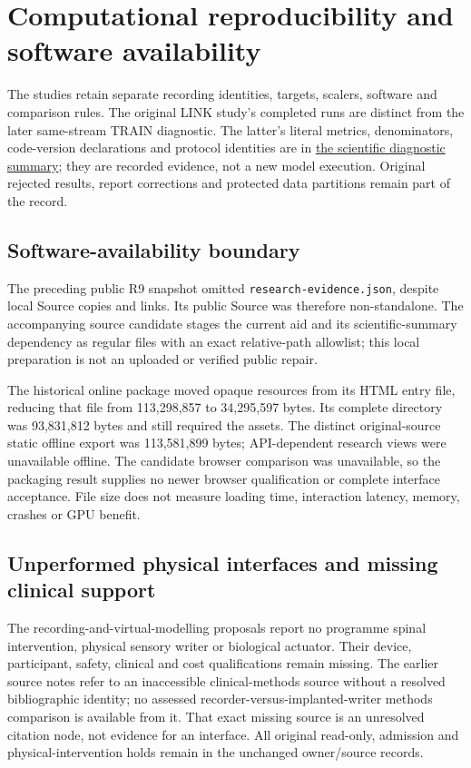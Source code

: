 \section{Computational reproducibility and software availability}
\label{app:reproducibility-availability}

The studies retain separate recording identities, targets, scalers, software and comparison rules. The original LINK study's completed runs are distinct from the later same-stream TRAIN diagnostic. The latter's literal metrics, denominators, code-version declarations and protocol identities are in \href{training-diagnostic-summary.json}{the scientific diagnostic summary}; they are recorded evidence, not a new model execution. Original rejected results, report corrections and protected data partitions remain part of the record.

\subsection{Software-availability boundary}
The preceding public R9 snapshot omitted \texttt{research-evidence.json}, despite local Source copies and links. Its public Source was therefore non-standalone. The accompanying source candidate stages the current aid and its scientific-summary dependency as regular files with an exact relative-path allowlist; this local preparation is not an uploaded or verified public repair.

The historical online package moved opaque resources from its HTML entry file, reducing that file from 113,298,857 to 34,295,597 bytes. Its complete directory was 93,831,812 bytes and still required the assets. The distinct original-source static offline export was 113,581,899 bytes; API-dependent research views were unavailable offline. The candidate browser comparison was unavailable, so the packaging result supplies no newer browser qualification or complete interface acceptance. File size does not measure loading time, interaction latency, memory, crashes or GPU benefit.

\subsection{Unperformed physical interfaces and missing clinical support}
The recording-and-virtual-modelling proposals report no programme spinal intervention, physical sensory writer or biological actuator. Their device, participant, safety, clinical and cost qualifications remain missing. The earlier source notes refer to an inaccessible clinical-methods source without a resolved bibliographic identity; no assessed recorder-versus-implanted-writer methods comparison is available from it. That exact missing source is an unresolved citation node, not evidence for an interface. All original read-only, admission and physical-intervention holds remain in the unchanged owner/source records.

